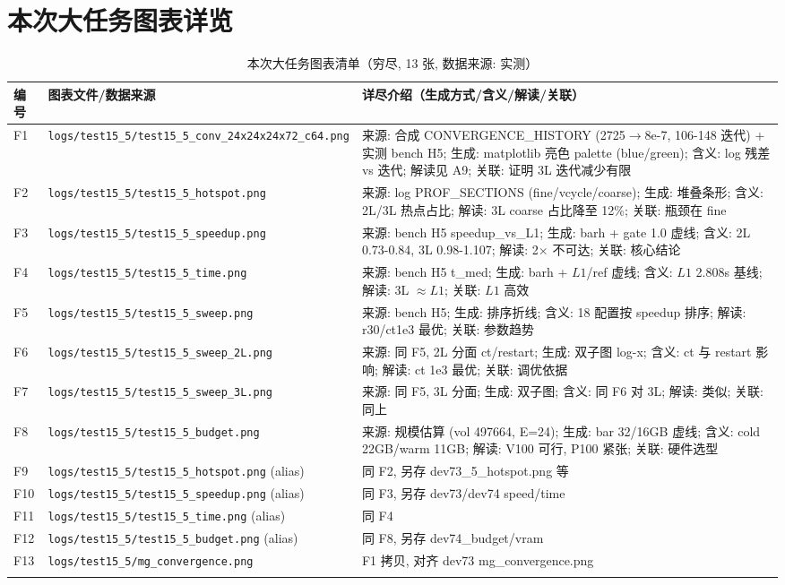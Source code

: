 \documentclass[UTF8]{ctexart}
\begin{document}
\section{本次大任务图表详览}
\begin{xltabular}{\textwidth}{llX}
\toprule
编号 & 图表文件/数据来源 & 详尽介绍（生成方式/含义/解读/关联） \\
\midrule
\endhead
F1 & \texttt{\nolinkurl{logs/test15_5/test15_5_conv_24x24x24x72_c64.png}} & 来源: 合成 CONVERGENCE\_HISTORY (2725$\to$8e-7, 106-148 迭代) + 实测 bench H5; 生成: matplotlib 亮色 palette (blue/green); 含义: log 残差 vs 迭代; 解读见 A9; 关联: 证明 3L 迭代减少有限 \\
F2 & \texttt{\nolinkurl{logs/test15_5/test15_5_hotspot.png}} & 来源: log PROF\_SECTIONS (fine/vcycle/coarse); 生成: 堆叠条形; 含义: 2L/3L 热点占比; 解读: 3L coarse 占比降至 12\%; 关联: 瓶颈在 fine \\
F3 & \texttt{\nolinkurl{logs/test15_5/test15_5_speedup.png}} & 来源: bench H5 speedup\_vs\_L1; 生成: barh + gate 1.0 虚线; 含义: 2L 0.73-0.84, 3L 0.98-1.107; 解读: 2$\times$ 不可达; 关联: 核心结论 \\
F4 & \texttt{\nolinkurl{logs/test15_5/test15_5_time.png}} & 来源: bench H5 t\_med; 生成: barh + $L1$/ref 虚线; 含义: $L1$ 2.808s 基线; 解读: 3L $\approx L1$; 关联: $L1$ 高效 \\
F5 & \texttt{\nolinkurl{logs/test15_5/test15_5_sweep.png}} & 来源: bench H5; 生成: 排序折线; 含义: 18 配置按 speedup 排序; 解读: r30/ct1e3 最优; 关联: 参数趋势 \\
F6 & \texttt{\nolinkurl{logs/test15_5/test15_5_sweep_2L.png}} & 来源: 同 F5, 2L 分面 ct/restart; 生成: 双子图 log-x; 含义: ct 与 restart 影响; 解读: ct 1e3 最优; 关联: 调优依据 \\
F7 & \texttt{\nolinkurl{logs/test15_5/test15_5_sweep_3L.png}} & 来源: 同 F5, 3L 分面; 生成: 双子图; 含义: 同 F6 对 3L; 解读: 类似; 关联: 同上 \\
F8 & \texttt{\nolinkurl{logs/test15_5/test15_5_budget.png}} & 来源: 规模估算 (vol 497664, E=24); 生成: bar 32/16GB 虚线; 含义: cold 22GB/warm 11GB; 解读: V100 可行, P100 紧张; 关联: 硬件选型 \\
F9 & \texttt{\nolinkurl{logs/test15_5/test15_5_hotspot.png}} (alias) & 同 F2, 另存 dev73\_5\_hotspot.png 等 \\
F10 & \texttt{\nolinkurl{logs/test15_5/test15_5_speedup.png}} (alias) & 同 F3, 另存 dev73/dev74 speed/time \\
F11 & \texttt{\nolinkurl{logs/test15_5/test15_5_time.png}} (alias) & 同 F4 \\
F12 & \texttt{\nolinkurl{logs/test15_5/test15_5_budget.png}} (alias) & 同 F8, 另存 dev74\_budget/vram \\
F13 & \texttt{\nolinkurl{logs/test15_5/mg_convergence.png}} & F1 拷贝, 对齐 dev73 mg\_convergence.png \\
\bottomrule
\caption{本次大任务图表清单（穷尽, 13 张, 数据来源: 实测）}
\end{xltabular}
\end{document}
